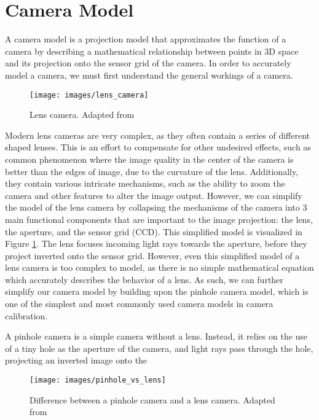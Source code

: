 \section{Camera Model} \label{sec:camera_model}

A camera model is a projection model that approximates the function of a camera by describing a mathematical relationship between points in 3D space and its projection onto the sensor grid of the camera. In order to accurately model a camera, we must first understand the general workings of a camera.

\begin{figure}[H]
    \centering
    \texttt{[image: images/lens\_camera]}
    \caption{Lens camera. Adapted from \cite{coltonPhysics1232012}} \label{fig:lens_camera}
\end{figure}


Modern lens cameras are very complex, as they often contain a series of different shaped lenses. This is an effort to compensate for other undesired effects, such as common phenomenon where the image quality in the center of the camera is better than the edges of image, due to the curvature of the lens. Additionally, they contain various intricate mechanisms, such as the ability to zoom the camera and other features to alter the image output. However, we can simplify the model of the lens camera by collapsing the mechanisms of the camera into 3 main functional components that are important to the image projection: the lens, the aperture, and the sensor grid (CCD). This simplified model is visualized in Figure \ref{fig:lens_camera}. The lens focuses incoming light rays towards the aperture, before they project inverted onto the sensor grid. However, even this simplified model of a lens camera is too complex to model, as there is no simple mathematical equation which accurately describes the behavior of a lens. As such, we can further simplify our camera model by building upon the pinhole camera model, which is one of the simplest and most commonly used camera models in camera calibration.

A pinhole camera is a simple camera without a lens. Instead, it relies on the use of a tiny hole as the aperture of the camera, and light rays pass through the hole, projecting an inverted image onto the

\begin{figure}[H]
    \centering
    \texttt{[image: images/pinhole\_vs\_lens]}
    \caption{Difference between a pinhole camera and a lens camera. Adapted from \cite{leCameraModel2018}}
\end{figure}



